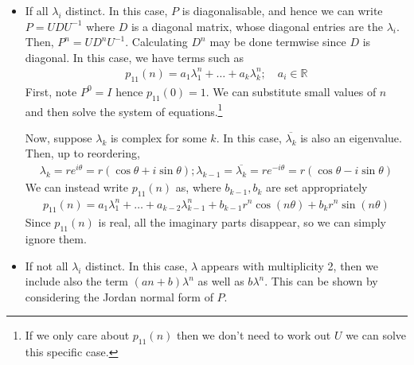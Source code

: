 \begin{itemize}
	\item If all $\lambda_i$ distinct.
	      In this case, $P$ is diagonalisable, and hence we can write $P = U D U^{-1}$ where $D$ is a diagonal matrix, whose diagonal entries are the $\lambda_i$.
	      Then, $P^n = U D^n U^{-1}$.
	      Calculating $D^n$ may be done termwise since $D$ is diagonal.
	      In this case, we have terms such as
	      \begin{align*}
		      p_{11}(n) = a_1 \lambda_1^n + \dots + a_k \lambda_k^n; \quad a_i \in \mathbb R
	      \end{align*}
	      First, note $P^0 = I$ hence $p_{11}(0) = 1$.
	      We can substitute small values of $n$ and then solve the system of equations.\footnote{If we only care about $p_{11}(n)$ then we don't need to work out $U$ we can solve this specific case.}

	      Now, suppose $\lambda_k$ is complex for some $k$.
	      In this case, $\overline{\lambda_k}$ is also an eigenvalue.
	      Then, up to reordering,
	      \begin{align*}
		      \lambda_k = re^{i\theta} = r(\cos \theta + i \sin \theta); \lambda_{k-1} = \overline{\lambda_k} = re^{-i\theta} = r(\cos \theta - i \sin \theta)
	      \end{align*}
	      We can instead write $p_{11}(n)$ as, where $b_{k-1}, b_k$ are set appropriately
	      \begin{align*}
		      p_{11}(n) = a_1 \lambda_1^n + \dots + a_{k - 2} \lambda_{k-1}^n + b_{k-1} r^n \cos (n\theta) + b_k r^n \sin (n\theta)
	      \end{align*}
	      Since $p_{11}(n)$ is real, all the imaginary parts disappear, so we can simply ignore them.
	\item If not all $\lambda_i$ distinct.
	      In this case, $\lambda$ appears with multiplicity 2, then we include also the term $(an + b) \lambda^n$ as well as $b \lambda^n$.
	      This can be shown by considering the Jordan normal form of $P$.
\end{itemize}
